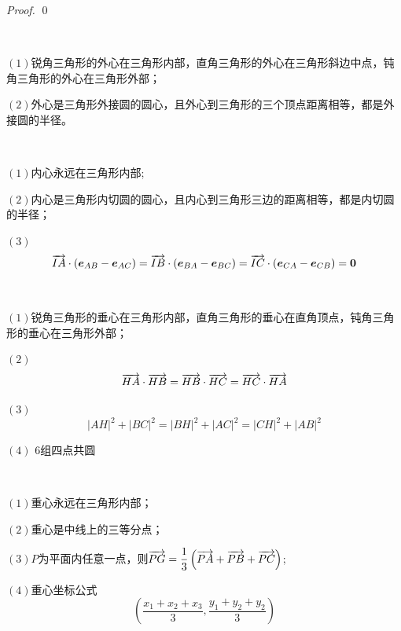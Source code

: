 \begin{proof}
    \qed
\end{proof}
\begin{character}[外心的性质]
    \                     

    \((1)\)锐角三角形的外心在三角形内部，直角三角形的外心在三角形斜边中点，钝角三角形的外心在三角形外部；

    \((2)\)外心是三角形外接圆的圆心，且外心到三角形的三个顶点距离相等，都是外接圆的半径。
\end{character}

\begin{character}[内心的性质]
    \

    \((1)\)内心永远在三角形内部;

    \((2)\)内心是三角形内切圆的圆心，且内心到三角形三边的距离相等，都是内切圆的半径；
    
    \((3)\)\[\overrightarrow{IA}\cdot(\boldsymbol{e}_{AB}-\boldsymbol{e}_{AC})=\overrightarrow{IB}\cdot(\boldsymbol{e}_{BA}-\boldsymbol{e}_{BC})=\overrightarrow{IC}\cdot(\boldsymbol{e}_{CA}-\boldsymbol{e}_{CB})=\boldsymbol{0}\]

\end{character}

\begin{character}[垂心的性质]
    \ 

    \((1)\)锐角三角形的垂心在三角形内部，直角三角形的垂心在直角顶点，钝角三角形的垂心在三角形外部；

    \((2)\)\[\overrightarrow{HA}\cdot\overrightarrow{HB}=\overrightarrow{HB}\cdot\overrightarrow{HC}=\overrightarrow{HC}\cdot\overrightarrow{HA}\]

    \((3)\)\[|AH|^2+|BC|^2=|BH|^2+|AC|^2=|CH|^2+|AB|^2\]

    \((4)\) \(6\)组四点共圆
\end{character}

\begin{character}[重心的性质]
    \

    \((1)\)重心永远在三角形内部；

    \((2)\)重心是中线上的三等分点；

    \((3)\)\(P\)为平面内任意一点，则\(\overrightarrow{PG}=\dfrac{1}{3}\left(\overrightarrow{PA}+\overrightarrow{PB}+\overrightarrow{PC}\right)\);

    \((4)\)重心坐标公式\[\left(\dfrac{x_1+x_2+x_3}{3},\dfrac{y_1+y_2+y_2}{3}\right)\]
\end{character}


